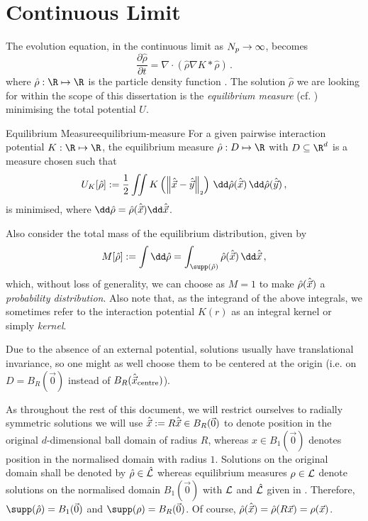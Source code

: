 \section{Continuous Limit}
The evolution equation, in the continuous limit as $N_p \rightarrow \infty$, becomes
\begin{equation}
  \frac{\partial \hat{\rho}}{\partial t} = \nabla \cdot \left(\hat{\rho} \nabla K * \hat{\rho}\right)\,.
  \label{eq:continuous-evolution-equation}
\end{equation}
where $\hat{\rho}: \R \mapsto \R$ is the particle density function \parencite{2021-carillo-radial}.
The solution $\hat{\rho}$ we are looking for within the scope of this dissertation is the \textit{equilibrium measure} (cf. ) minimising the total potential $U$.

\begin{definition}{Equilibrium Measure}{equilibrium-measure}
  For a given pairwise interaction potential $K: \R \mapsto \R$, the equilibrium measure $\hat{\rho}: D \mapsto \R$ with $D \subseteq \R^d$ is a measure chosen such that
  $$U_K[\hat{\rho}] := \frac{1}{2} \iint K\left(\norm{\hatvec{x} - \hatvec{y}}\right) \,\dd\hat{\rho}(\hatvec{x})\,\dd\hat{\rho}(\hatvec{y})\,,$$
  is minimised, where $\dd\hat{\rho} = \hat{\rho}(\hatvec{x})\dd\hatvec{x}$.
\end{definition}
Also consider the total mass of the equilibrium distribution, given by
\begin{equation}
  M[\hat{\rho}] := \int \dd\hat{\rho} = \int_{\supp(\hat{\rho})} \hat{\rho}(\hatvec{x}) \,\dd\hatvec{x}\,,
  \label{eq:measure-mass}
\end{equation}
which, without loss of generality, we can choose as $M = 1$ to make $\hat{\rho}(\hat{\vec{x}})$ a \textit{probability distribution}.
Also note that, as the integrand of the above integrals, we sometimes refer to the interaction potential $K(r)$ as an integral kernel or simply \textit{kernel}.

Due to the absence of an external potential, solutions usually have translational invariance, so one might as well choose them to be centered at the origin (i.e. on $D = B_R(\vec{0})$ instead of $B_R(\hat{\vec{x}}_{\text{centre}})$).

As throughout the rest of this document, we will restrict ourselves to radially symmetric solutions we will use $\hat{\vec{x}} := R\hat{\vec{x}} \in B_R(\vec{0})$ to denote position in the original $d$-dimensional ball domain of radius $R$, whereas $x \in B_1(\vec{0})$ denotes position in the normalised domain with radius $1$.
Solutions on the original domain shall be denoted by $\hat{\rho} \in \hat{\mathcal{L}}$ whereas equilibrium measures $\rho \in \mathcal{L}$ denote solutions on the normalised domain $B_1(\vec{0})$ with $\mathcal{L}$ and $\hat{\mathcal{L}}$ given in .
Therefore, $\supp(\hat{\rho}) = B_1(\vec{0})$ and $\supp(\rho) = B_R(\vec{0})$.
Of course, $\hat{\rho}(\hat{\vec{x}}) = \hat{\rho}(R\vec{x}) = \rho(\vec{x})$.


